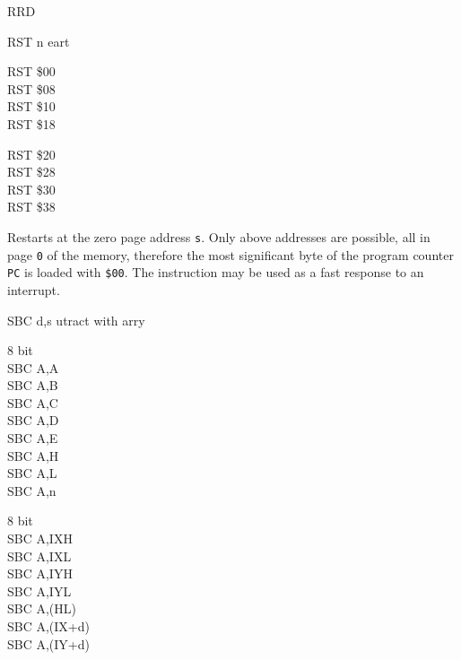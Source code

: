 \begin{basedescript}{
	\desclabelstyle{\multilinelabel}
	\desclabelwidth{3cm}}
\begin{DetailItem}{RRD}
		\begin{DetailTiming}
		\end{DetailTiming}

	\end{DetailItem}

	\begin{DetailItem}{RST n}
		{e\IH{ST}art}
		{\SymRST{n}}

		\begin{DetailVariants}
			RST \$00\\
			RST \$08\\
			RST \$10\\
			RST \$18
			
			\columnbreak
			RST \$20\\
			RST \$28\\
			RST \$30\\
			RST \$38
		\end{DetailVariants}

		Restarts at the zero page address {\tt s}. Only above addresses are possible, all in page {\tt 0} of the memory, therefore the most significant byte of the program counter {\tt PC} is loaded with {\tt \$00}. The instruction may be used as a fast response to an interrupt.

		\begin{DetailEffects}
			\FlagsRSTn				
		\end{DetailEffects}

		\begin{DetailTiming}
			\DetailTime{3}{11}
		\end{DetailTiming}

	\end{DetailItem}

	\pagebreak
	\begin{DetailItem}{SBC d,s}
		{utract with arry}
		{\SymSBC{d}{s}}
	
		\begin{DetailVariants}
			\textnormal{8 bit}\\
			SBC A,A\\
			SBC A,B\\
			SBC A,C\\
			SBC A,D\\
			SBC A,E\\
			SBC A,H\\
			SBC A,L\\
			SBC A,n

			\columnbreak
			\textnormal{8 bit}\\
			SBC A,IXH\UNDOC\\
			SBC A,IXL\UNDOC\\
			SBC A,IYH\UNDOC\\
			SBC A,IYL\UNDOC\\
			SBC A,(HL)\\
			SBC A,(IX+d)\\
			SBC A,(IY+d)


\end{DetailVariants}
\end{DetailItem}
\end{basedescript}
